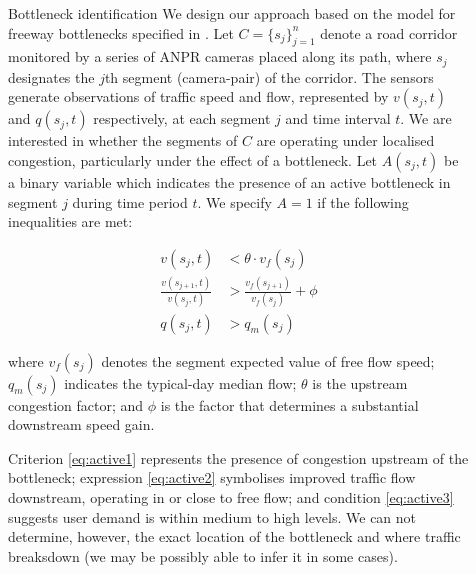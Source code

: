 \documentclass[final]{beamer}
\newlength{\sepwidth}
\newlength{\colwidth}
\newcommand{\separatorcolumn}{\begin{column}{\sepwidth}\end{column}}
\begin{document}
\begin{frame}[t]
\begin{columns}[t]
\begin{column}{\colwidth}
\begin{block}{Bottleneck identification }
    We design our approach based on the model for freeway bottlenecks specified
    in \cite{chen2004}.
    Let $C = \{ s_j \}_{j=1}^{n}$ denote a road corridor monitored by a series
    of ANPR cameras placed along its path, where $s_j$ designates the $j$th
    segment (camera-pair) of the corridor. The sensors generate
    observations of traffic speed and flow, represented by $v(s_j, t)$ and
    $q(s_j, t)$ respectively, at each segment $j$ and time interval $t$. We are
    interested in whether the segments of $C$ are operating under localised
    congestion, particularly under the effect of a bottleneck. Let $A(s_j,t)$
    be a binary variable which indicates the presence of an active bottleneck in
    segment $j$ during time period $t$. We specify $A=1$ if the following
    inequalities are met:

    \vspace{-0.25cm}

    \begin{align}
    v(s_j, t) &< \theta \cdot v_f(s_j) \label{eq:active1} \\[10pt]
    \frac{v(s_{j+1}, t)}{v(s_j, t)} &> \frac{v_f(s_{j+1})}{v_f(s_j)} + \phi \label{eq:active2} \\[10pt]
    q(s_j, t) &> q_m(s_j) \label{eq:active3}
    \end{align}

    where $v_f(s_j)$ denotes the segment expected value of free flow speed;
     $q_m(s_j)$ indicates the typical-day median flow; $\theta$ is the
    upstream congestion factor; and $\phi$ is the factor that determines a
    substantial downstream speed gain.

    Criterion \ref{eq:active1} represents the presence of congestion upstream
    of the bottleneck; expression \ref{eq:active2} symbolises improved traffic
    flow downstream, operating in or close to free flow; and condition
    \ref{eq:active3} suggests user demand is within medium to high levels.
    We can not determine, however, the exact location of the bottleneck and
    where traffic breaksdown (we may be possibly able to infer it in some cases).

  \end{block}

\end{column}

\separatorcolumn

\begin{column}{\colwidth}



\end{column}
\end{columns}
\end{frame}
\end{document}

